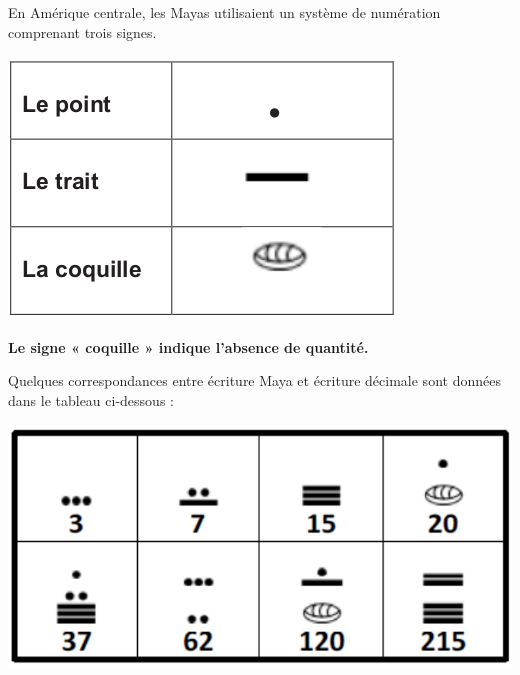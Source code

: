 En Amérique centrale, les Mayas utilisaient un système de numération comprenant trois signes.

\begin{center}
	\includegraphics[width=.4\textwidth]{./images/2022-g2-ex5-img1.png}
\end{center}

\textbf{Le signe « coquille » indique l’absence de quantité.}

Quelques correspondances entre écriture Maya et écriture décimale sont données dans le
tableau ci-dessous :

\begin{center}
	\includegraphics[width=.6\textwidth]{./images/2022-g2-ex5-img2.png}
\end{center}

